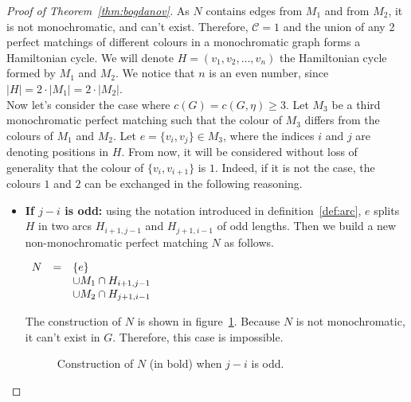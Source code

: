\begin{proof}[Proof of Theorem~\ref{thm:bogdanov}]
    As $N$ contains edges from $M_1$ and from $M_2$, it is not monochromatic, and can't exist.
    Therefore, $\mathcal{C} = 1$ and the union of any 2 perfect matchings of different colours in a monochromatic graph forms a Hamiltonian cycle.
    We will denote $H = (v_1, v_2, \dots, v_n)$ the Hamiltonian cycle formed by $M_1$ and $M_2$.
    We notice that $n$ is an even number, since $|H| = 2 \cdot |M_1| = 2 \cdot |M_2|$.\\

    Now let's consider the case where $c(G) = c(G, \eta) \geq 3$.
    Let $M_3$ be a third monochromatic perfect matching such that the colour of $M_3$ differs from the colours of $M_1$ and $M_2$.
    Let $e = \{v_i, v_j\} \in M_3$, where the indices $i$ and $j$ are denoting positions in $H$.
    From now, it will be considered without loss of generality that the colour of $\{v_i, v_{i+1}\}$ is $1$.
    Indeed, if it is not the case, the colours $1$ and $2$ can be exchanged in the following reasoning.

    \begin{itemize}
        \item
            \textbf{If $j - i$ is odd:} using the notation introduced in definition~\ref{def:arc}, $e$ splits $H$ in two arcs $H_{i+1, j-1}$ and $H_{j+1, i-1}$ of odd lengths.
            Then we build a new non-monochromatic perfect matching $N$ as follows.
            
            \begin{center}
                $\begin{array}{r c l}
                    N & = & \{e\} \\
                      &   & \cup M_1 \cap H_{i+1, j-1} \\
                      &   & \cup M_2 \cap H_{j+1, i-1}
                \end{array}$
            \end{center}
            
            The construction of $N$ is shown in figure~\ref{fig:proof_simplified_odd}.
            Because $N$ is not monochromatic, it can't exist in $G$.
            Therefore, this case is impossible.
            
            \begin{figure}[H]
                \caption{Construction of $N$ (in bold) when $j - i$ is odd.}
                \label{fig:proof_simplified_odd}
            \end{figure}
            

\end{itemize}
\end{proof}
